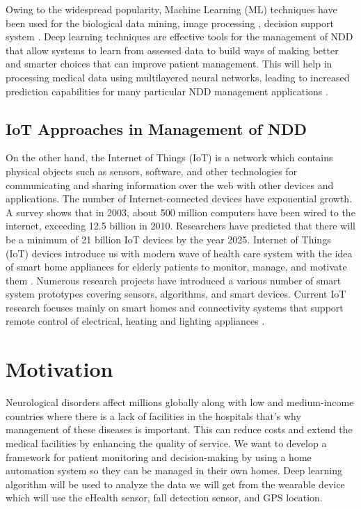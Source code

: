 Owing to the widespread popularity, Machine Learning (ML) techniques have been used for the biological data mining, image processing   \cite{ali2019segmentation}, decision support system \cite{kaiser2018tits}. 
Deep learning techniques are effective tools for the management of NDD that allow systems to learn from assessed data to build ways of making better and smarter choices that can improve patient management. This will help in processing medical data using multilayered neural networks, leading to increased prediction capabilities for many particular NDD management applications \cite{mahmud2018applications,mahmud2020dltools}. 
\subsection{IoT Approaches in Management of NDD}
On the other hand, the Internet of Things (IoT) is a network which contains physical objects such as sensors, software, and other technologies for communicating and sharing information over the web with other devices and applications. The number of Internet-connected
devices have exponential growth. A survey shows that in 2003, about 500 million computers have been wired to the internet, exceeding 12.5 billion in 2010. Researchers have predicted that there will be a minimum of 21 billion IoT devices by the year 2025. 
Internet of Things (IoT) devices introduce us with  modern wave of health care system with the idea of smart home appliances for elderly patients to monitor, manage, and motivate them \cite{lam_future_2010}. Numerous research projects have introduced a various number of smart system prototypes covering sensors, algorithms, and smart devices. 
Current IoT research focuses mainly on smart homes and connectivity systems that support remote control of electrical, heating and lighting appliances \cite{arunvivek_framework_2015}.
%

\section{Motivation}
Neurological disorders affect millions globally along with low and medium-income countries where there is a lack of facilities in the hospitals that’s why management of these diseases is important. This can reduce costs and extend the medical facilities by enhancing the quality of service. We want to develop a framework for patient monitoring and decision-making by using a home automation system so they can be managed in their own homes. Deep learning algorithm will be used to analyze the data we will get from the wearable device which will use the eHealth sensor, fall detection sensor, and GPS location.

